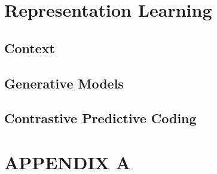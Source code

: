 \documentclass[oneside,openright,titlepage,numbers=noenddot,openany,headinclude,footinclude=true, cleardoublepage=empty,abstractoff,BCOR=5mm,paper=a4,fontsize=11pt, dvipsnames]{scrreprt}
\begin{document}
\part{Representation Learning}
\chapter{Context}

\clearpage
\chapter{Generative Models}

\chapter{Contrastive Predictive Coding}



\clearpage 

\part{APPENDIX A}




\nocite{*}


\end{document}
